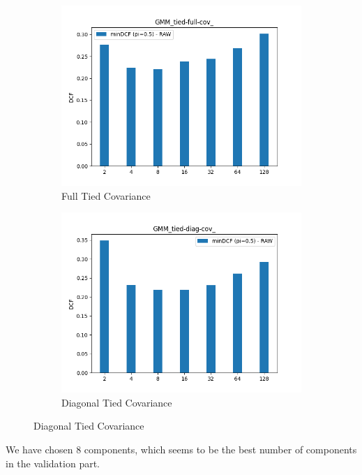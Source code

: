 \documentclass[english]{report}
\begin{document}
\begin{figure}[h!]
\begin{subfigure}{0.4\textwidth}
        \includegraphics[scale=0.4]{../../images/evaluation/GMM_tied-full-cov_component_comparison}
        \caption{Full Tied Covariance}
    \end{subfigure}
    \begin{subfigure}{0.4\textwidth}
        \includegraphics[scale=0.4]{../../images/evaluation/GMM_tied-diag-cov_component_comparison}
        \caption{Diagonal Tied Covariance}
    \end{subfigure}
    \centering
    \label{fig:GMM_eval}
\end{figure}
We have chosen 8 components, which seems to be the best number of components in the validation part.
\newline
\end{document}
